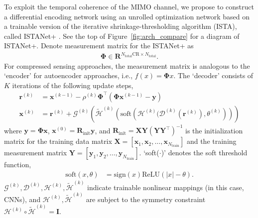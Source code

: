 To exploit the temporal coherence of the MIMO channel, we propose to construct a differential encoding network using an unrolled optimization network based on a trainable version of the iterative shrinkage-thresholding algorithm (ISTA), called ISTANet+ \cite{ref:zhang2018ista}. See the top of Figure~\ref{fig:arch_compare} for a diagram of ISTANet+. Denote measurement matrix for the ISTANet+ as 
\begin{align}
    \mathbf \Phi \in \mathbf{R}^{N_{\text{total}}\text{CR} \times N_{\text{total}}}.
\end{align}
For compressed sensing approaches, the measurement matrix is analogous to the `encoder' for autoencoder approaches, i.e., $f(x)=\mathbf\Phi x$. The `decoder' consists of $K$ iterations of the following update steps,
\begin{align}
    \mathbf{r}^{(k)} &= \mathbf{x}^{(k-1)}-\rho^{(k)}\mathbf{\Phi}^\top(\mathbf{\Phi}\mathbf x^{(k-1)}-\mathbf y) \\
    \mathbf x^{(k)} &= \mathbf{r}^{(k)} + \mathcal{G}^{(k)}\left(\tilde{\mathcal{H}}^{(k)}\left(\text{soft}\left(\mathcal{H}^{(k)}(\mathcal{D}^{(k)}(\mathbf{r}^{(k)}), \theta^{(k)}\right)\right)\right)
\end{align}
where $\mathbf y=\mathbf{\Phi} \mathbf x$, $\mathbf x^{(0)}=\mathbf{R}_{\text{init}}\mathbf{y}$, and $\mathbf R_{\text{init}}=\mathbf {XY}(\mathbf{YY}^\top)^{-1}$ is the initialization matrix for the training data matrix $\mathbf X = \left[\mathbf{x}_1, \mathbf{x}_2,\dots, \mathbf{x}_{N_{\text{train}}}\right]$ and the training measurement matrix $\mathbf Y = \left[\mathbf{y}_1, \mathbf{y}_2,\dots, \mathbf{y}_{N_{\text{train}}}\right]$. `soft($\cdot$)' denotes the soft threshold function,
\begin{align}
    \text{soft}(x, \theta) &= \text{sign}(x)\text{ReLU}(|x|-\theta). \label{eq:soft}
\end{align}
$\mathcal G^{(k)}, \mathcal D^{(k)},  \mathcal H^{(k)}, \tilde{\mathcal H}^{(k)}$ indicate trainable nonlinear mappings (in this case, CNNs), and $\mathcal H^{(k)}, \tilde{\mathcal H}^{(k)}$ are subject to the symmetry constraint $\mathcal H^{(k)}\circ \tilde{\mathcal H}^{(k)}=\mathbf I$.

